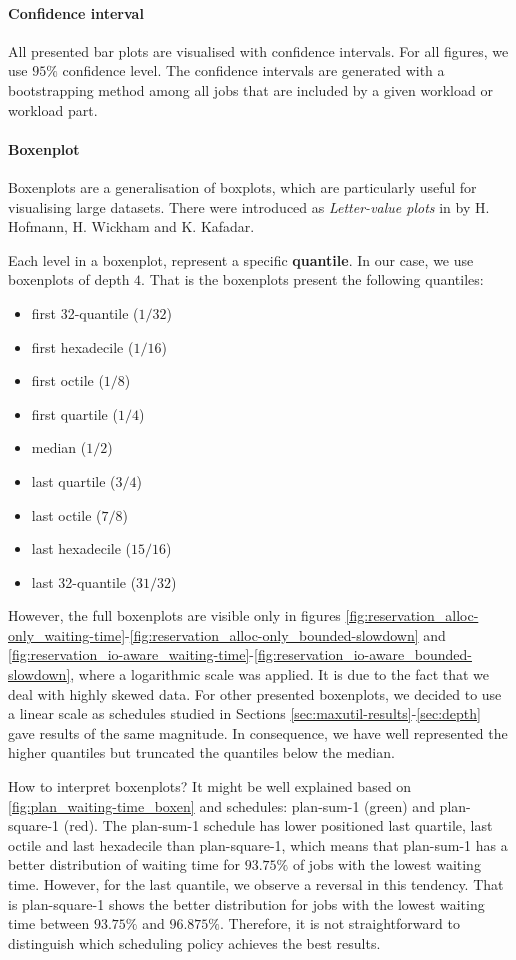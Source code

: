 \documentclass[thesis-en.tex]{subfiles}
\begin{document}
\paragraph{Confidence interval}
All presented bar plots are visualised with confidence intervals. For all figures, we use $95\%$ confidence level. The confidence intervals are generated with a bootstrapping method among all jobs that are included by a given workload or workload part.

\paragraph{Boxenplot}
Boxenplots are a generalisation of boxplots, which are particularly useful for visualising large datasets. There were introduced as \emph{Letter-value plots} in \cite{doi:10.1080/10618600.2017.1305277} by H. Hofmann, H. Wickham and K. Kafadar. 

Each level in a boxenplot, represent a specific \textbf{quantile}. In our case, we use boxenplots of depth $4$. That is the boxenplots present the following quantiles:
\medskip
\begin{itemize}[nosep]
    \item first 32-quantile ($1/32$)
    \item first hexadecile ($1/16$)
    \item first octile ($1/8$)
    \item first quartile ($1/4$)
    \item median ($1/2$)
    \item last quartile ($3/4$)
    \item last octile ($7/8$)
    \item last hexadecile ($15/16$)
    \item last 32-quantile ($31/32$)
\end{itemize}
\medskip
 However, the full boxenplots are visible only in figures \ref{fig:reservation_alloc-only_waiting-time}-\ref{fig:reservation_alloc-only_bounded-slowdown} and \ref{fig:reservation_io-aware_waiting-time}-\ref{fig:reservation_io-aware_bounded-slowdown}, where a logarithmic scale was applied. It is due to the fact that we deal with highly skewed data. For other presented boxenplots, we decided to use a linear scale as schedules studied in Sections \ref{sec:maxutil-results}-\ref{sec:depth} gave results of the same magnitude. In consequence, we have well represented the higher quantiles but truncated the quantiles below the median.

How to interpret boxenplots? It might be well explained based on \autoref{fig:plan_waiting-time_boxen} and schedules: plan-sum-1 (green) and plan-square-1 (red). The plan-sum-1 schedule has lower positioned last quartile, last octile and last hexadecile than plan-square-1, which means that plan-sum-1 has a better distribution of waiting time for $93.75\%$ of jobs with the lowest waiting time. However, for the last quantile, we observe a reversal in this tendency. That is plan-square-1 shows the better distribution for jobs with the lowest waiting time between $93.75\%$ and $96.875\%$. Therefore, it is not straightforward to distinguish which scheduling policy achieves the best results.
\end{document}
